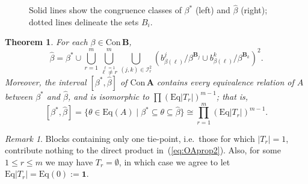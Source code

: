 \documentclass[cm,dissertation]{uhthesis}
\theoremstyle{plain}
\newtheorem{theorem}{Theorem}[section]
\theoremstyle{definition}
\theoremstyle{remark}
\newtheorem*{remark}{Remark}
\numberwithin{theorem}{section}
\numberwithin{claim}{chapter}
\numberwithin{equation}{section}
\numberwithin{conjecture}{chapter}
\newcommand{\<}{\ensuremath{\langle}}
\renewcommand{\>}{\ensuremath{\rangle}}
\renewcommand{\leq}{\ensuremath{\leqslant}}
\newcommand{\Eq}{\ensuremath{\mathrm{Eq}}}
\newcommand{\Con}{\ensuremath{\mathrm{Con\,}}}
\newcommand{\0}{\ensuremath{\mathbf{0}}}
\newcommand{\1}{\ensuremath{\mathbf{1}}}
\newcommand{\2}{\ensuremath{\mathbf{2}}}
\newcommand{\3}{\ensuremath{\mathbf{3}}}
\newcommand{\4}{\ensuremath{\mathbf{4}}}
\newcommand{\5}{\ensuremath{\mathbf{5}}}
\newcommand{\bA}{\ensuremath{\mathbf{A}}}
\newcommand{\bB}{\ensuremath{\mathbf{B}}}
\newcommand{\sI}{\ensuremath{\mathscr{I}}}
\newcommand{\one}{\ensuremath{\mathbf{1}}}
\newcommand{\hbeta}{\ensuremath{\widehat{\beta}}}
\begin{document}
\begin{figure}[h!]
{
      }
      \caption{Solid lines show the congruence classes of $\beta^*$ (left) and 
        $\hbeta$ (right); dotted lines delineate the sets $B_i$.}
      \label{fig:overalgebra1}
\end{figure}

\begin{theorem} 
  \label{OAthm2}
  For each $\beta \in \Con \bB$, 
  \begin{equation}
    \label{eq:OAbetahat}
    \widehat{\beta} = 
    \beta^* \cup 
    \bigcup_{r=1}^m
    \bigcup^m_{\stackrel{\ell=1}{\ell \neq r}}
    \bigcup_{(j,k) \in \sI_r^2}
    \left(b^j_{\beta(\ell)}/\beta^{\bB_j} \cup b^k_{\beta(\ell)}/\beta^{\bB_k}\right)^2.
  \end{equation}
  Moreover, the interval $[\beta^*, \widehat{\beta}]$ of $\Con\bA$ 
  contains every equivalence relation of $A$ between $\beta^*$ and $\hbeta$, and
  is isomorphic to $\prod (\Eq |T_r|)^{m-1}$; that is,
  \begin{equation}
    \label{eq:OAprop2}
          [\beta^*, \widehat{\beta}] 
          = 
          \{\theta \in \Eq(A) \mid \beta^* \subseteq \theta \subseteq \widehat{\beta} \}
          \cong \prod_{r=1}^m (\Eq |T_r|)^{m-1}.
  \end{equation}
\end{theorem}
\begin{remark}
  Blocks containing only one tie-point, i.e.~those for which $|T_r| = 1$,
  contribute nothing to the direct product in~(\ref{eq:OAprop2}). Also, for some
  $1\leq r \leq m$ we may have $T_r = \emptyset$, in which case we agree 
  to let $\Eq |T_r| = \Eq (0) := \one$.
\end{remark}
\end{document}
